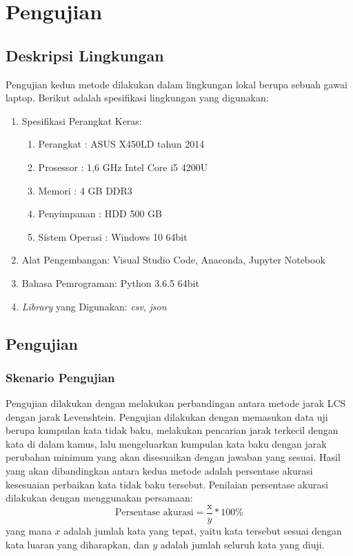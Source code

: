 \chapter{Pengujian}

\section{Deskripsi Lingkungan}

Pengujian kedua metode dilakukan dalam lingkungan lokal berupa sebuah gawai laptop. Berikut adalah spesifikasi lingkungan yang digunakan:

\begin{enumerate}
    \item Spesifikasi Perangkat Keras:
    \begin{enumerate}
        \item Perangkat \tab : ASUS X450LD tahun 2014
        \item Prosessor \tab : 1,6 GHz Intel Core i5 4200U
        \item Memori \tab : 4 GB DDR3
        \item Penyimpanan \tab : HDD 500 GB
        \item Sistem Operasi \tab : Windows 10 64bit
    \end{enumerate}
    \item Alat Pengembangan: Visual Studio Code, Anaconda, Jupyter Notebook
    \item Bahasa Pemrograman: Python 3.6.5 64bit
    \item \textit{Library} yang Digunakan: \textit{csv}, \textit{json}
\end{enumerate}

\section{Pengujian}

\subsection{Skenario Pengujian}

Pengujian dilakukan dengan melakukan perbandingan antara metode jarak LCS dengan jarak Levenshtein. Pengujian dilakukan dengan memasukan data uji berupa kumpulan kata tidak baku, melakukan pencarian jarak terkecil dengan kata di dalam kamus, lalu mengeluarkan kumpulan kata baku dengan jarak perubahan minimum yang akan disesuaikan dengan jawaban yang sesuai. Hasil yang akan dibandingkan antara kedua metode adalah persentase akurasi kesesuaian perbaikan kata tidak baku tersebut. Penilaian persentase akurasi dilakukan dengan menggunakan persamaan:
\begin{equation*}
	\text{Persentase akurasi}=\frac{\text{x}}{y}*100\%
\end{equation*}
\noindent
yang mana $x$ adalah jumlah kata yang tepat, yaitu kata tersebut sesuai dengan kata luaran yang diharapkan, dan $y$ adalah jumlah seluruh kata yang diuji.

